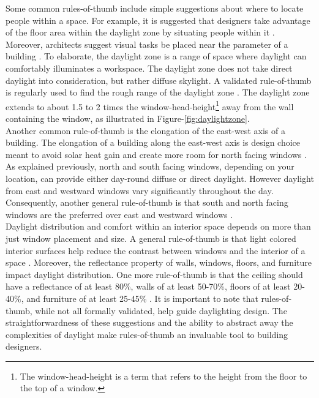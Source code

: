 Some common rules-of-thumb include simple suggestions about where to locate people within a space.  For example, it is suggested that designers take advantage of the floor area within the daylight zone by situating people within it \cite{Leslie}.  Moreover, architects suggest visual tasks be placed near the parameter of a building \cite{Leslie}.  To elaborate, the daylight zone is a range of space where daylight can comfortably illuminates a workspace.  The daylight zone does not take direct daylight into consideration, but rather diffuse skylight.  A validated rule-of-thumb is regularly used to find the rough range of the daylight zone \cite{reinhart2005simulation}.  The daylight zone extends to about 1.5 to 2 times the window-head-height\footnote{The window-head-height is a term that refers to the height from the floor to the top of a window.} away from the wall containing the window, as illustrated in Figure-\ref{fig:daylightzone}.  \\

Another common rule-of-thumb is the elongation of the east-west axis of a building.  The elongation of a building along the east-west axis is design choice meant to avoid solar heat gain and create more room for north facing windows \cite{Leslie}.  As explained previously, north and south facing windows, depending on your location, can provide either day-round diffuse or direct daylight.  However daylight from east and westward windows vary significantly throughout the day.  Consequently, another general rule-of-thumb is that south and north facing windows are the preferred over east and westward windows \cite{reinhart_lecture}.\\

Daylight distribution and comfort within an interior space depends on more than just window placement and size.
A general rule-of-thumb is that light colored interior surfaces help reduce the contrast between windows and the interior of a space \cite{Leslie}.
Moreover, the reflectance property of walls, windows, floors, and furniture impact daylight distribution.
One more rule-of-thumb is that the ceiling should have a reflectance of at least 80\%, walls of at least 50-70\%, floors of at least 20-40\%, and furniture of at least 25-45\% \cite{reinhart_lecture}.
It is important to note that rules-of-thumb, while not all formally validated, help guide daylighting design.
The straightforwardness of these suggestions and the ability to abstract away the complexities of daylight make rules-of-thumb an invaluable tool to building designers.
\\

